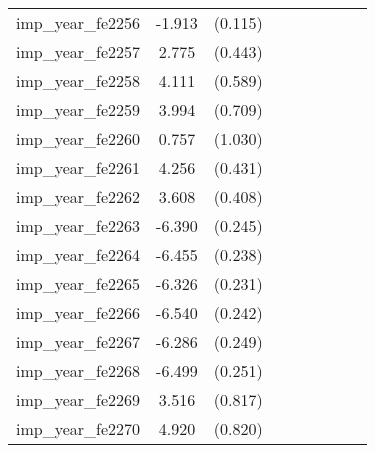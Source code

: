 {\begin{tabular}{l*{4}{cc}}
imp\_year\_fe2256&   -1.913\sym{***}&  (0.115)&                  &         &                  &         &                  &         \\
imp\_year\_fe2257&    2.775\sym{***}&  (0.443)&                  &         &                  &         &                  &         \\
imp\_year\_fe2258&    4.111\sym{***}&  (0.589)&                  &         &                  &         &                  &         \\
imp\_year\_fe2259&    3.994\sym{***}&  (0.709)&                  &         &                  &         &                  &         \\
imp\_year\_fe2260&    0.757         &  (1.030)&                  &         &                  &         &                  &         \\
imp\_year\_fe2261&    4.256\sym{***}&  (0.431)&                  &         &                  &         &                  &         \\
imp\_year\_fe2262&    3.608\sym{***}&  (0.408)&                  &         &                  &         &                  &         \\
imp\_year\_fe2263&   -6.390\sym{***}&  (0.245)&                  &         &                  &         &                  &         \\
imp\_year\_fe2264&   -6.455\sym{***}&  (0.238)&                  &         &                  &         &                  &         \\
imp\_year\_fe2265&   -6.326\sym{***}&  (0.231)&                  &         &                  &         &                  &         \\
imp\_year\_fe2266&   -6.540\sym{***}&  (0.242)&                  &         &                  &         &                  &         \\
imp\_year\_fe2267&   -6.286\sym{***}&  (0.249)&                  &         &                  &         &                  &         \\
imp\_year\_fe2268&   -6.499\sym{***}&  (0.251)&                  &         &                  &         &                  &         \\
imp\_year\_fe2269&    3.516\sym{***}&  (0.817)&                  &         &                  &         &                  &         \\
imp\_year\_fe2270&    4.920\sym{***}&  (0.820)&                  &         &                  &         &                  &         \\

\end{tabular}}

